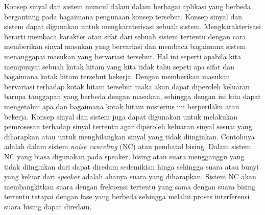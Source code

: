 Konsep sinyal dan sistem muncul dalam dalam berbagai aplikasi yang berbeda bergantung pada bagaimana pengunaan konsep tersebut. Konsep sinyal dan sistem dapat digunakan untuk mengkaraterisasi sebuah sistem. Mengkarakterisasi berarti membaca karakter atau sifat dari sebuah sistem tertentu dengan cara memberikan sinyal masukan yang bervariasi dan membaca bagaimana sistem menanggapai masukan yang bervariasi tersebut. Hal ini seperti apabila kita mempunyai sebuah kotak hitam yang kita tidak tahu sepeti apa sifat dan bagaimana kotak hitam tersebut bekerja. Dengan memberikan masukan bervariasi terhadap kotak hitam tersebut maka akan dapat diperoleh keluaran barupa tanggapan yang berbeda dengan masukan, sehingga dengan ini kita dapat mengetahui apa dan bagaimana kotak hitam misterius ini berperilaku atau bekerja. Konsep sinyal dan sistem juga dapat digunakan untuk melakukan pemrosesan terhadap sinyal tertentu agar diperoleh keluaran sinyal sesuai yang diharapkan atau untuk menghilangkan sinyal yang tidak diinginkan. Contohnya adalah dalam sistem \textit{noise canceling} (NC) atau pembatal bising. Dalam sistem NC yang biasa digunakan pada speaker, bising atau suara mengganggu yang tidak diinginkan dari dapat diredam sedemikian hinga sehingga suara atau bunyi yang keluar dari \textit{speaker} adalah ahanya suara yang diharapkan. Sistem NC akan membangkitkan suara dengan frekuensi tertentu yang sama dengan suara bising tertentu tetapai dengan fase yang berbeda sehingga melalui proses interferensi suara bising dapat diredam. 

